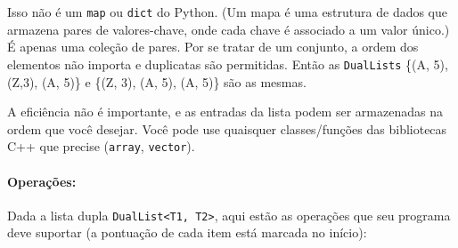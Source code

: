 \documentclass{article}
\begin{document}
Isso não é um \texttt{map} ou \texttt{dict} do Python. (Um mapa é uma estrutura de dados que armazena pares de valores-chave, onde cada chave é associado a um valor único.) É apenas uma coleção de pares. Por se tratar de um conjunto, a ordem dos elementos não importa e duplicatas são permitidas. Então as \texttt{DualLists} \{(A, 5), (Z,3), (A, 5)\} e \{(Z, 3), (A, 5), (A, 5)\} são as mesmas.

A eficiência não é importante, e as entradas da lista podem ser armazenadas na ordem que você desejar. Você pode use quaisquer classes/funções das bibliotecas C++ que precise (\texttt{array}, \texttt{vector}).

\paragraph{Operações:} Dada a lista dupla \texttt{DualList<T1, T2>}, aqui estão as operações que seu programa deve suportar (a pontuação de cada item está marcada no início):
\end{document}
